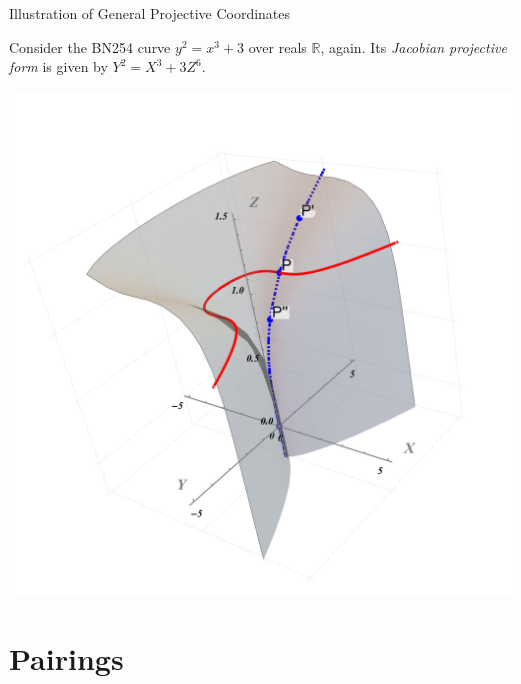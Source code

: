 \documentclass[xcolor={usenames,dvipsnames}]{beamer}
\begin{document}
    \begin{frame}{Illustration of General Projective Coordinates}
        \begin{example}
            Consider the BN254 curve $y^2 = x^3 + 3$ over reals $\mathbb{R}$, again. Its \textit{Jacobian projective form} is given by $Y^2 = X^3 + 3Z^6$.
            \begin{center}
                \includegraphics[trim={275 140 225 100}, width=0.3\linewidth, clip]{images/lecture_4/projective_ec_jacobian.pdf}
                
            \end{center}
        \end{example}
    \end{frame}

    \section{Pairings}
\end{document}
